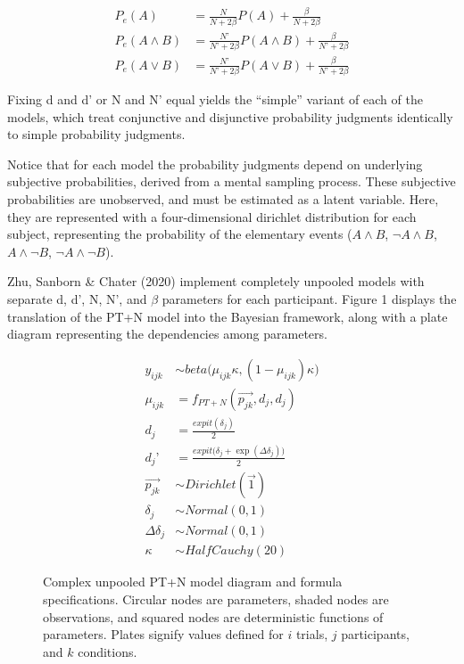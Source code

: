 \documentclass[
  english,
  man,floatsintext]{apa6}
\begin{document}
\begin{align*}
  P_{e}(A) &= \frac{N}{N + 2 \beta}P(A) + \frac{\beta}{N+2 \beta} \\
  P_{e}(A \land B) &= \frac{N’}{N’ + 2 \beta}P(A \land B) + \frac{\beta}{N’+2 \beta} \\
  P_{e}(A \lor B) &= \frac{N’}{N’ + 2 \beta}P(A \lor B) + \frac{\beta}{N’+2 \beta} 
\end{align*}

Fixing d and d' or N and N' equal yields the ``simple'' variant of each of the models, which treat conjunctive and disjunctive probability judgments identically to simple probability judgments.

Notice that for each model the probability judgments depend on underlying subjective probabilities, derived from a mental sampling process. These subjective probabilities are unobserved, and must be estimated as a latent variable. Here, they are represented with a four-dimensional dirichlet distribution for each subject, representing the probability of the elementary events (\(A \land B\), \(\neg A \land B\), \(A \land \neg B\), \(\neg A \land \neg B\)).

Zhu, Sanborn \& Chater (2020) implement completely unpooled models with separate d, d', N, N', and \(\beta\) parameters for each participant. Figure 1 displays the translation of the PT+N model into the Bayesian framework, along with a plate diagram representing the dependencies among parameters.

\begin{figure}
  \begin{minipage}{.5\textwidth}
    \flushright
    
  \end{minipage}%
  \begin{minipage}{.5\textwidth}
    \flushleft
    \small
    \begin{align}
      y_{ijk} &\sim beta\big(\mu_{ijk} \kappa, (1-\mu_{ijk}) \kappa \big) \\
      \mu_{ijk} &= f_{PT+N}(\overrightarrow{p_{jk}}, d_j, d_j)  \\
      d_j &= \frac{expit(\delta_j)}{2} \\
      d_j’ &= \frac{expit\big(\delta_j + \exp(\Delta\delta_j)\big)}{2} \\
      \overrightarrow{p_{jk}} &\sim Dirichlet(\overrightarrow{1}) \\
      \delta_j &\sim Normal(0,1) \\
      \Delta\delta_j &\sim Normal(0,1) \\
      \kappa &\sim HalfCauchy(20)
    \end{align}
  \end{minipage}
  \caption{Complex unpooled PT+N model diagram and formula specifications. Circular nodes are parameters, shaded nodes are observations, and squared nodes are deterministic functions of parameters. Plates signify values defined for $i$ trials, $j$ participants, and $k$ conditions.}
\end{figure}
\end{document}
